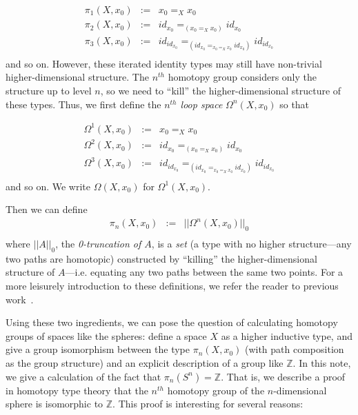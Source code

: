 \[
\begin{array}{rcl}
\pi_1(X,x_0) & := & x_0 =_X x_0 \\
\pi_2(X,x_0) & := & id_{{x_0}} =_{{(x_0 =_X x_0)}} id_{{x_0}} \\
\pi_3(X,x_0) & := & id_{{id_{x_0}}} =_{(id_{{x_0}} =_{{x_0 =_X x_0}} id_{{x_0}})} id_{{id_{x_0}}} \\
\end{array}
\]
and so on.  However, these iterated identity types may still have
non-trivial higher-dimensional structure.  The $n^{th}$ homotopy group
considers only the structure up to level $n$, so we need to ``kill'' the
higher-dimensional structure of these types.  Thus, we first define the
\emph{$n^{th}$ loop space} $\Omega^n(X,x_0)$ so that

\[
\begin{array}{rcl}
\Omega^1(X,x_0) & := & x_0 =_X x_0 \\
\Omega^2(X,x_0) & := & id_{{x_0}} =_{{(x_0 =_X x_0)}} id_{{x_0}} \\
\Omega^3(X,x_0) & := & id_{{id_{x_0}}} =_{(id_{{x_0}} =_{{x_0 =_X x_0}} id_{{x_0}})} id_{{id_{x_0}}} \\
\end{array}
\]
and so on.  We write $\Omega(X,x_0)$ for $\Omega^1(X,x_0)$.  

Then we can define 
\[
\begin{array}{rcl}
\pi_n(X,x_0) & := & ||\Omega^n(X,x_0)||_0 \\
\end{array}
\]
where $||A||_0$, the \emph{0-truncation of $A$}, is a \emph{set} (a type
with no higher structure---any two paths are homotopic) constructed by
``killing'' the higher-dimensional structure of $A$---i.e. equating any
two paths between the same two points.  For a more leisurely
introduction to these definitions, we refer the reader to previous work~\citep{ls13pi1s1,uf13hott-book}.

Using these two ingredients, we can pose the question of calculating
homotopy groups of spaces like the spheres:
define a space $X$ as a
higher inductive type, and give
a group isomorphism between the type $\pi_n(X,x_0)$ (with path
composition as the group structure) and an explicit description of a
group like $\mathbb{Z}$.  In this note, we give a calculation of the
fact that $\pi_n(S^n) = \mathbb{Z}$. That is, we describe a proof in
homotopy type theory that the $n^{th}$ homotopy group of the
$n$-dimensional sphere is isomorphic to $\mathbb{Z}$.  This proof is
interesting for several reasons:

